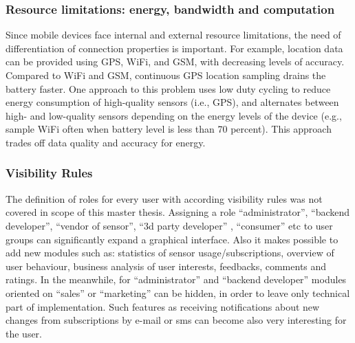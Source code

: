 \subsubsection {Resource limitations: energy, bandwidth and computation}
Since mobile devices face internal and external resource limitations, the need of differentiation of connection properties is important. For example, location data can be provided using GPS, WiFi, and GSM, with decreasing levels of accuracy. Compared to WiFi and GSM, continuous GPS location sampling drains the battery faster. One approach to this problem uses low duty cycling to reduce energy consumption of high-quality sensors (i.e., GPS), and alternates between high- and low-quality sensors depending on the energy levels of the device (e.g., sample WiFi often when battery level is less than 70 percent). This approach trades off data quality and accuracy for energy. 

\subsubsection {Visibility Rules}
The definition of roles for every user with according visibility rules was not covered in scope of this master thesis. Assigning a role ``administrator'', ``backend developer'', ``vendor of sensor'', ``3d party developer'' , ``consumer'' etc to user groups can significantly expand a graphical interface. Also it makes possible to add new modules such as: statistics of sensor usage/subscriptions, overview of user behaviour, business analysis of user interests, feedbacks, comments and ratings. In the meanwhile, for ``administrator'' and ``backend developer'' modules oriented on ``sales'' or ``marketing'' can be hidden, in order to leave only technical part of implementation. Such features as receiving notifications about new changes from subscriptions by e-mail or sms can become also very interesting for the user.

